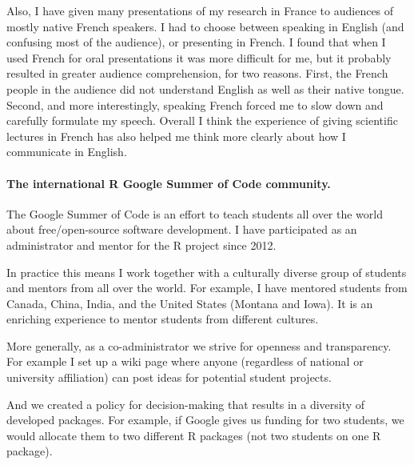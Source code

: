 \documentclass{article}
\begin{document}
Also, I have given many presentations of my research in
France to audiences of mostly native French speakers. I had to choose
between speaking in English (and confusing most of the audience), or
presenting in French. I found that when I used French for oral
presentations it was more difficult for me, but it probably resulted
in greater audience comprehension, for two reasons. First, the French
people in the audience did not understand English as well as their
native tongue. Second, and more interestingly, speaking French forced
me to slow down and carefully formulate my speech. Overall I think the
experience of giving scientific lectures in French has also helped me
think more clearly about how I communicate in English. 

\paragraph{The international R Google Summer of Code community.}
The Google Summer of Code is an effort to teach students all over the world about free/open-source software development. I have participated as an administrator and mentor for the R project since 2012.

In practice this means I work together with a culturally diverse group of students and mentors from all over the world. For example, I have mentored students from Canada, China, India, and the United States (Montana and Iowa). It is an enriching experience to mentor students from different cultures.

More generally, as a co-administrator we strive for openness and transparency. For example I set up a wiki page where anyone (regardless of national or university affiliation) can post ideas for potential student projects.

And we created a policy for decision-making that results in a diversity of developed packages. For example, if Google gives us funding for two students, we would allocate them to two different R packages (not two students on one R package).
\end{document}
